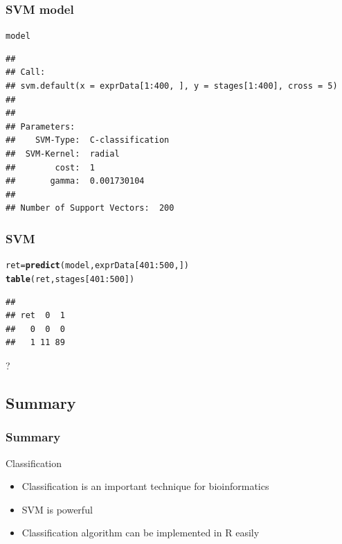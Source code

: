 \documentclass[UTF8]{beamer}\usepackage[]{graphicx}\usepackage[]{color}
\makeatletter
\newcommand{\hlnum}[1]{\textcolor[rgb]{0.686,0.059,0.569}{#1}}%
\newcommand{\hlopt}[1]{\textcolor[rgb]{0,0,0}{#1}}%
\newcommand{\hlstd}[1]{\textcolor[rgb]{0.345,0.345,0.345}{#1}}%
\newcommand{\hlkwb}[1]{\textcolor[rgb]{0.69,0.353,0.396}{#1}}%
\newcommand{\hlkwd}[1]{\textcolor[rgb]{0.737,0.353,0.396}{\textbf{#1}}}%
\newenvironment{kframe}{%
 \def\at@end@of@kframe{}%
 \ifinner\ifhmode%
  \def\at@end@of@kframe{\end{minipage}}%
  \begin{minipage}{\columnwidth}%
 \fi\fi%
 \def\FrameCommand##1{\hskip\@totalleftmargin \hskip-\fboxsep
 \colorbox{shadecolor}{##1}\hskip-\fboxsep
     \hskip-\linewidth \hskip-\@totalleftmargin \hskip\columnwidth}%
 \MakeFramed {\advance\hsize-\width
   \@totalleftmargin\z@ \linewidth\hsize
   \@setminipage}}%
 {\par\unskip\endMakeFramed%
 \at@end@of@kframe}
\newenvironment{knitrout}{}{} %
\makeatother
\begin{document}
\begin{frame}[fragile]
  \frametitle{SVM model}
\tiny
\begin{knitrout}
\color{fgcolor}\begin{kframe}
\begin{alltt}
 \hlstd{model}
\end{alltt}
\begin{verbatim}
## 
## Call:
## svm.default(x = exprData[1:400, ], y = stages[1:400], cross = 5)
## 
## 
## Parameters:
##    SVM-Type:  C-classification 
##  SVM-Kernel:  radial 
##        cost:  1 
##       gamma:  0.001730104 
## 
## Number of Support Vectors:  200
\end{verbatim}
\end{kframe}
\end{knitrout}
\end{frame}

\begin{frame}[fragile]
  \frametitle{SVM}
\begin{knitrout}
\color{fgcolor}\begin{kframe}
\begin{alltt}
 \hlstd{ret} \hlkwb{=} \hlkwd{predict}\hlstd{(model, exprData[}\hlnum{401}\hlopt{:}\hlnum{500}\hlstd{,])}
 \hlkwd{table}\hlstd{(ret, stages[}\hlnum{401}\hlopt{:}\hlnum{500}\hlstd{])}
\end{alltt}
\begin{verbatim}
##    
## ret  0  1
##   0  0  0
##   1 11 89
\end{verbatim}
\end{kframe}
\end{knitrout}
\centerline{\huge{?}}
\end{frame}


\subsection{Summary}

\begin{frame}[fragile]
  \frametitle{Summary}
\begin{block}{Classification}

  \begin{itemize}
  \item Classification is an important technique for bioinformatics
  \item SVM is powerful
  \item Classification algorithm can be implemented in R easily
  \end{itemize}
\end{block}
\end{frame}
\end{document}
